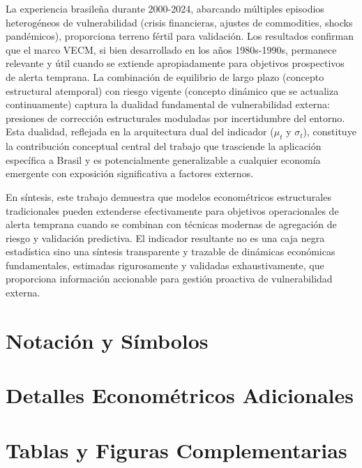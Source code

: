 \documentclass[3p,11pt,draft,natbib=false]{elsarticle}
\begin{document}
La experiencia brasileña durante 2000-2024, abarcando múltiples episodios heterogéneos de vulnerabilidad (crisis financieras, ajustes de commodities, shocks pandémicos), proporciona terreno fértil para validación. Los resultados confirman que el marco VECM, si bien desarrollado en los años 1980s-1990s, permanece relevante y útil cuando se extiende apropiadamente para objetivos prospectivos de alerta temprana. La combinación de equilibrio de largo plazo (concepto estructural atemporal) con riesgo vigente (concepto dinámico que se actualiza continuamente) captura la dualidad fundamental de vulnerabilidad externa: presiones de corrección estructurales moduladas por incertidumbre del entorno. Esta dualidad, reflejada en la arquitectura dual del indicador ($\mu_t$ y $\sigma_t$), constituye la contribución conceptual central del trabajo que trasciende la aplicación específica a Brasil y es potencialmente generalizable a cualquier economía emergente con exposición significativa a factores externos.

En síntesis, este trabajo demuestra que modelos econométricos estructurales tradicionales pueden extenderse efectivamente para objetivos operacionales de alerta temprana cuando se combinan con técnicas modernas de agregación de riesgo y validación predictiva. El indicador resultante no es una caja negra estadística sino una síntesis transparente y trazable de dinámicas económicas fundamentales, estimadas rigurosamente y validadas exhaustivamente, que proporciona información accionable para gestión proactiva de vulnerabilidad externa.

\appendix

\section{Notación y Símbolos}
\label{app:notacion}


\section{Detalles Econométricos Adicionales}
\label{app:detalles}


\section{Tablas y Figuras Complementarias}
\label{app:figuras}


\printbibliography[title=Referencias]
\end{document}
